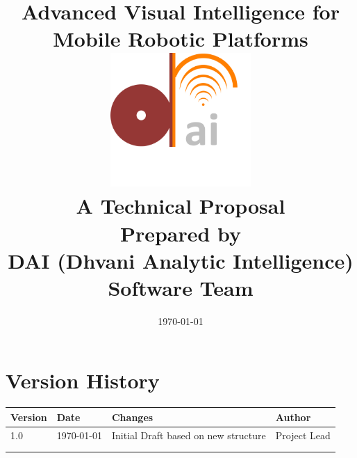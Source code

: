 \documentclass{report} %
\title{
    \vspace{2cm} %
    \textbf{\Huge Advanced Visual Intelligence for Mobile Robotic Platforms} \\
    \vspace{1.5cm} %
    \includegraphics[width=0.4\textwidth]{logo.png} \\ %
    \vspace{1.5cm} %
    \Large A Technical Proposal \\
    \vspace{2cm} %
    \normalsize Prepared by \\
    \large \textbf{DAI (Dhvani Analytic Intelligence) Software Team}
}
\author{} %
\date{\today}
\begin{document}
\begin{titlepage}
    \thispagestyle{empty} %
    \maketitle
\end{titlepage}


\chapter*{Version History}
\begin{table}[h!]
    \centering
    \begin{tabular}{|l|l|p{8cm}|l|}
        \hline
        \textbf{Version} & \textbf{Date} & \textbf{Changes} & \textbf{Author} \\
        \hline
        1.0 & \today & Initial Draft based on new structure & Project Lead \\
        \hline
        & & & \\
        \hline
        & & & \\

        \hline
    \end{tabular}
\end{table}

\newpage


\tableofcontents
\newpage





\end{document}
